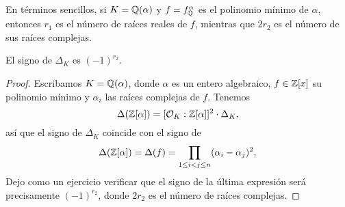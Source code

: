 En términos sencillos, si $K = \mathbb{Q} (\alpha)$ y $f = f^\alpha_{\mathbb{Q}}$ es
el polinomio mínimo de $\alpha$, entonces $r_1$ es el número de raíces reales
de $f$, mientras que $2 r_2$ es el número de sus raíces complejas.

\begin{proposicion}
  El signo de $\Delta_K$ es $(-1)^{r_2}$.

  \begin{proof}
    Escribamos $K = \mathbb{Q} (\alpha)$, donde $\alpha$ es un entero algebraico,
    $f \in \mathbb{Z} [x]$ su polinomio mínimo y $\alpha_i$ las raíces complejas
    de $f$. Tenemos
    $$\Delta (\mathbb{Z} [\alpha]) = [\mathcal{O}_K : \mathbb{Z} [\alpha]]^2 \cdot \Delta_K,$$
    así que el signo de $\Delta_K$ coincide con el signo de
    \[ \Delta (\mathbb{Z} [\alpha]) = \Delta (f) =
       \prod_{1 \le i < j \le n} (\alpha_i - \alpha_j)^2, \]
    Dejo como un ejercicio verificar que el signo de la última expresión será
    precisamente $(-1)^{r_2}$, donde $2 r_2$ es el número de raíces complejas.
  \end{proof}
\end{proposicion}


